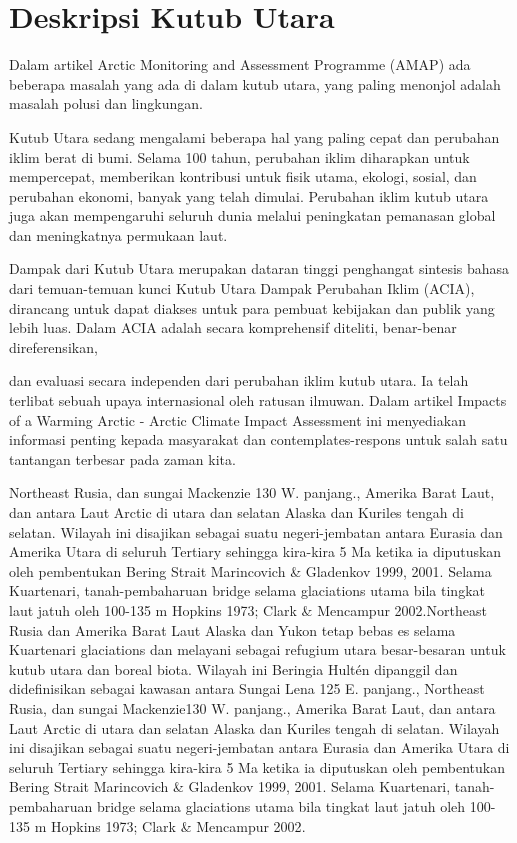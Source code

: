 %

\section{Deskripsi Kutub Utara}	


		Dalam artikel Arctic Monitoring and Assessment Programme (AMAP)  ada beberapa masalah yang ada di dalam 
	kutub utara, yang paling menonjol adalah masalah polusi dan lingkungan.
		
		Kutub Utara sedang mengalami beberapa hal yang paling cepat dan perubahan iklim berat di bumi. Selama 100 tahun, perubahan
	iklim diharapkan untuk mempercepat, memberikan kontribusi untuk fisik utama, ekologi, sosial, dan perubahan ekonomi, banyak yang 
	telah dimulai. Perubahan iklim kutub utara juga akan mempengaruhi seluruh dunia melalui peningkatan pemanasan global dan meningkatnya permukaan laut. 

	Dampak dari Kutub Utara merupakan dataran tinggi penghangat sintesis bahasa dari temuan-temuan kunci Kutub Utara Dampak Perubahan Iklim (ACIA), dirancang 
	untuk dapat diakses untuk para pembuat kebijakan dan publik yang lebih luas. Dalam ACIA adalah secara komprehensif diteliti, benar-benar direferensikan,

	dan evaluasi secara independen dari perubahan iklim kutub utara. Ia telah terlibat sebuah upaya internasional oleh ratusan ilmuwan.
	Dalam artikel Impacts of a Warming Arctic - Arctic Climate Impact Assessment ini menyediakan informasi penting kepada masyarakat dan contemplates-respons 
	untuk salah satu tantangan terbesar pada zaman kita.
	

		Northeast Rusia, dan sungai Mackenzie {130 W. panjang.}, Amerika Barat Laut, dan antara Laut Arctic di utara dan selatan Alaska dan
	Kuriles tengah di selatan. Wilayah ini disajikan sebagai suatu negeri-jembatan antara Eurasia dan Amerika Utara di seluruh Tertiary sehingga kira-kira 5 Ma
	ketika ia diputuskan oleh pembentukan Bering Strait {Marincovich \& Gladenkov 1999, 2001}. Selama Kuartenari, tanah-pembaharuan bridge selama glaciations 
	utama bila tingkat laut jatuh oleh 100-135 m {Hopkins 1973; Clark \& Mencampur 2002}.Northeast Rusia dan Amerika Barat Laut {Alaska dan Yukon} tetap bebas es 
	selama Kuartenari glaciations dan melayani sebagai refugium utara besar-besaran untuk kutub utara dan boreal biota. Wilayah ini Beringia Hultén dipanggil dan
	didefinisikan sebagai kawasan antara Sungai Lena {125 E. panjang.}, Northeast Rusia, dan sungai Mackenzie{130 W. panjang.}, 
	Amerika Barat Laut, dan antara Laut Arctic di utara dan selatan Alaska dan Kuriles tengah di selatan. Wilayah ini disajikan sebagai suatu negeri-jembatan antara 
	Eurasia dan Amerika Utara di seluruh Tertiary sehingga kira-kira 5 Ma ketika ia diputuskan oleh pembentukan Bering Strait {Marincovich \& Gladenkov 1999, 2001}. 
	Selama Kuartenari, tanah-pembaharuan bridge selama glaciations utama bila tingkat laut jatuh oleh 100-135 m {Hopkins 1973; Clark \& Mencampur 2002}.
	
